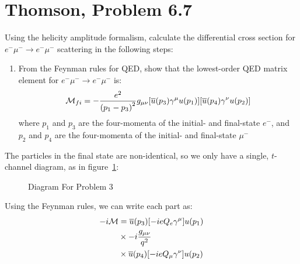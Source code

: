 \documentclass[12pt]{article}
\renewcommand{\bar}{\overline}
\newcommand{\M}{\mathcal{M}}
\begin{document}
\section{Thomson, Problem 6.7}
\begin{problem}
  Using the helicity amplitude formalism, calculate the differential cross section for $e^-\mu^-\to e^-\mu^-$ scattering in the following steps:
  \begin{enumerate}[label = (\alph*)]
  \item From the Feynman rules for QED, show that the lowest-order QED matrix element for $e^-\mu^-\to e^-\mu^-$ is:
    \begin{align*}
      \M_{fi}=-\frac{e^2}{{(p_1-p_3)}^2}g_{\mu\nu}
      \qty[\bar{u}(p_3)\gamma^\mu u(p_1)]
      \qty[\bar{u}(p_4)\gamma^\nu u(p_2)]
    \end{align*}
    where $p_1$ and $p_3$ are the four-momenta of the initial- and final-state $e^-$, and $p_2$ and $p_4$ are the four-momenta of the initial- and final-state $\mu^-$
  \end{enumerate}
\end{problem}
The particles in the final state are non-identical, so we only have a single, $t$-channel diagram, as in figure~\ref{fig:p3}:
\begin{figure}[H]
  \centering
  \caption{Diagram For Problem 3}\label{fig:p3}
\end{figure}
Using the Feynman rules, we can write each part as:
\begin{align*}
  -i\M&=\bar{u}(p_3)\qty[-ieQ_e\gamma^\mu]u(p_1)\\
  &\times -i\frac{g_{\mu\nu}}{q^2}\\
  &\times\bar{u}(p_4)\qty[-ieQ_\mu\gamma^\nu]u(p_2)
\end{align*}
\end{document}

